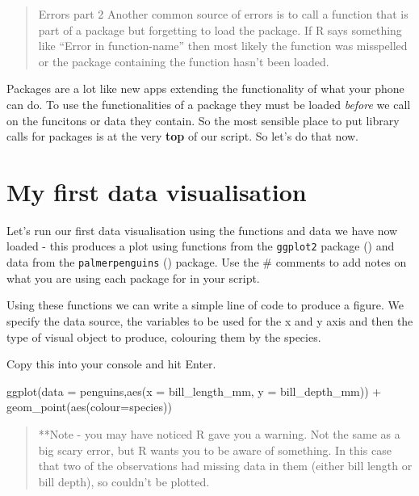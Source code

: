 \documentclass[
]{book}
\newenvironment{Shaded}{\begin{snugshade}}{\end{snugshade}}
\newcommand{\AttributeTok}[1]{\textcolor[rgb]{0.77,0.63,0.00}{#1}}
\newcommand{\FunctionTok}[1]{\textcolor[rgb]{0.00,0.00,0.00}{#1}}
\newcommand{\NormalTok}[1]{#1}
\newcommand{\SpecialCharTok}[1]{\textcolor[rgb]{0.00,0.00,0.00}{#1}}
\begin{document}
\begin{quote}
Errors part 2 Another common source of errors is to call a function that is part of a package but forgetting to load the package. If R says something like ``Error in function-name'' then most likely the function was misspelled or the package containing the function hasn't been loaded.
\end{quote}

Packages are a lot like new apps extending the functionality of what your phone can do. To use the functionalities of a package they must be loaded \emph{before} we call on the funcitons or data they contain. So the most sensible place to put library calls for packages is at the very \textbf{top} of our script. So let's do that now.

\hypertarget{my-first-data-visualisation}{%
\section{My first data visualisation}\label{my-first-data-visualisation}}

Let's run our first data visualisation using the functions and data we have now loaded - this produces a plot using functions from the \texttt{ggplot2} package (\citet{R-ggplot2}) and data from the \texttt{palmerpenguins} (\citet{R-palmerpenguins}) package. Use the \# comments to add notes on what you are using each package for in your script.

Using these functions we can write a simple line of code to produce a figure. We specify the data source, the variables to be used for the x and y axis and then the type of visual object to produce, colouring them by the species.

Copy this into your console and hit Enter.

\begin{Shaded}
\begin{Highlighting}[]
\FunctionTok{ggplot}\NormalTok{(}\AttributeTok{data =}\NormalTok{ penguins,}\FunctionTok{aes}\NormalTok{(}\AttributeTok{x =}\NormalTok{ bill\_length\_mm, }\AttributeTok{y =}\NormalTok{ bill\_depth\_mm)) }\SpecialCharTok{+} \FunctionTok{geom\_point}\NormalTok{(}\FunctionTok{aes}\NormalTok{(}\AttributeTok{colour=}\NormalTok{species)) }
\end{Highlighting}
\end{Shaded}

\begin{quote}
**Note - you may have noticed R gave you a warning. Not the same as a big scary error, but R wants you to be aware of something. In this case that two of the observations had missing data in them (either bill length or bill depth), so couldn't be plotted.
\end{quote}
\end{document}
